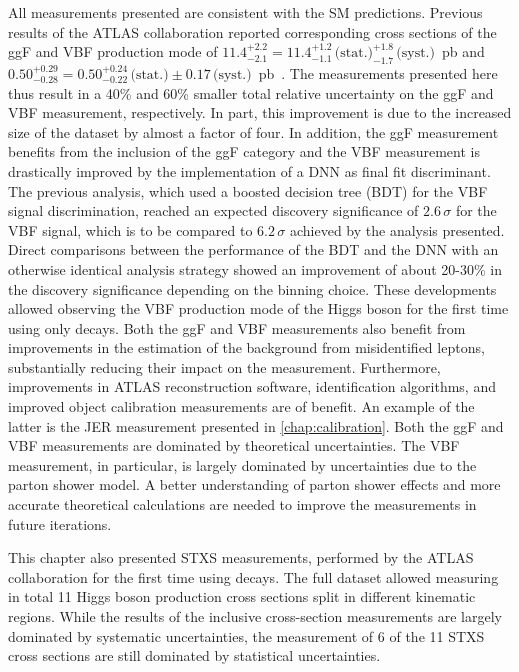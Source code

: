 All measurements presented are consistent with the SM predictions. 
Previous \RunTwo results of the ATLAS collaboration reported corresponding cross sections of the ggF and VBF production mode of $11.4^{+2.2}_{-2.1} = 11.4^{+1.2}_{-1.1}\,\text{(stat.)}^{+1.8}_{-1.7}\,\text{(syst.)}$~pb and $0.50^{+0.29}_{-0.28} = 0.50^{+0.24}_{-0.22}\,\text{(stat.)}\pm 0.17\,\text{(syst.)}$~pb~\cite{HIGG-2016-07}.
The measurements presented here thus result in a 40\% and 60\% smaller total relative uncertainty on the ggF and VBF measurement, respectively. In part, this improvement is due to the increased size of the dataset by almost a factor of four.
In addition, the ggF measurement benefits from the inclusion of the ggF \TwoJet category and the VBF measurement is drastically improved by the implementation of a DNN as final fit discriminant. 
The previous analysis, which used a boosted decision tree (BDT) for the VBF signal discrimination, reached an expected discovery significance of $2.6\,\sigma$ for the VBF signal, which is to be compared to $6.2\,\sigma$ achieved by the analysis presented. 
Direct comparisons between the performance of the BDT and the DNN with an otherwise identical analysis strategy showed an improvement of about 20-30\% in the discovery significance depending on the binning choice. %
These developments allowed observing the VBF production mode of the Higgs boson for the first time using only \HWW decays.
Both the ggF and VBF measurements also benefit from improvements in the estimation of the background from misidentified leptons, substantially reducing their impact on the measurement. 
Furthermore, improvements in ATLAS reconstruction software, identification algorithms, and improved object calibration measurements are of benefit. 
An example of the latter is the JER measurement presented in \cref{chap:calibration}. 
Both the ggF and VBF measurements are dominated by theoretical uncertainties. 
The VBF measurement, in particular, is largely dominated by uncertainties due to the parton shower model. 
A better understanding of parton shower effects and more accurate theoretical calculations are needed to improve the measurements in future iterations.~\cite{J_ger_2020} 

This chapter also presented STXS measurements, performed by the ATLAS collaboration for the first time using \HWW decays. 
The full \RunTwo dataset allowed measuring in total 11 Higgs boson production cross sections split in different kinematic regions. 
While the results of the inclusive cross-section measurements are largely dominated by systematic uncertainties, the measurement of 6 of the 11 STXS cross sections are still dominated by statistical uncertainties. 

